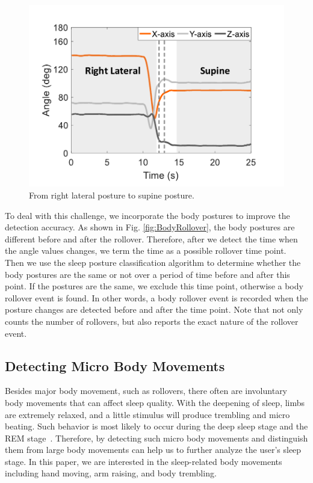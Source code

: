 \begin{figure}[!t]
\begin{minipage}[t]{0.31\linewidth}
    \includegraphics[width=0.97\linewidth]{Figures/RightToSupine.pdf}\centering
  \caption{From right lateral posture to supine posture.}\label{fig:RightToLeft}
\end{minipage}
\end{figure}

To deal with this challenge, we incorporate the body postures to improve the detection accuracy. As shown in Fig. \ref{fig:BodyRollover}, the body postures are different before and after the rollover. Therefore, after we detect the time when the angle values changes, we term the time as a possible rollover time point. Then we use the sleep posture classification algorithm to determine whether the body postures are the same or not over a period of time before and after this point. If the postures are the same, we exclude this time point, otherwise a body rollover event is found. In other words, a body rollover event is recorded when the posture changes are detected before and after the time point. Note that {\systemname} not only counts the number of rollovers, but also reports the exact nature of the rollover event.


\subsection{Detecting Micro Body Movements \label{sec:microbo}}

Besides major body movement, such as rollovers, there often are involuntary body movements that can affect sleep quality. With the deepening of sleep, limbs are extremely relaxed, and a little stimulus will produce trembling and micro beating. Such behavior is most likely to occur during the deep sleep stage and the REM stage~\cite{ancoli2003role,Jean2000Sleep}. Therefore, by detecting such micro body movements and distinguish them from large body movements can help us to further analyze the user's sleep stage. In this paper, we are interested in the sleep-related body movements including hand moving, arm raising, and body trembling.

